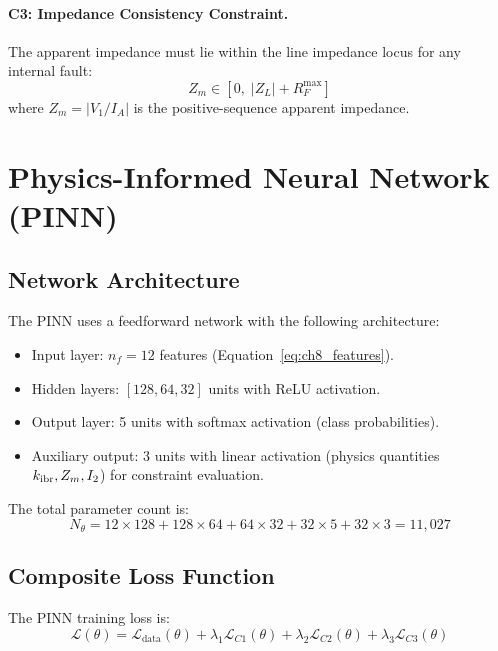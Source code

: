 \paragraph{C3: Impedance Consistency Constraint.}
The apparent impedance must lie within the line impedance locus for any
internal fault:
\begin{equation}
  Z_m \in [0,\; |Z_L| + R_F^\mathrm{max}]
  \label{eq:ch8_c3}
\end{equation}
where $Z_m = |V_1/I_A|$ is the positive-sequence apparent impedance.

\section{Physics-Informed Neural Network (PINN)}
\label{sec:ch8_pinn}

\subsection{Network Architecture}

The PINN uses a feedforward network with the following architecture:
\begin{itemize}
\item Input layer: $n_f = 12$ features (Equation~\ref{eq:ch8_features}).
\item Hidden layers: $[128, 64, 32]$ units with ReLU activation.
\item Output layer: 5 units with softmax activation (class probabilities).
\item Auxiliary output: 3 units with linear activation (physics quantities
      $k_\mathrm{ibr}, Z_m, I_2$) for constraint evaluation.
\end{itemize}
The total parameter count is:
\begin{equation}
  N_\theta = 12 \times 128 + 128 \times 64 + 64 \times 32 + 32 \times 5
  + 32 \times 3 = 11{,}027
  \label{eq:ch8_params}
\end{equation}

\subsection{Composite Loss Function}

The PINN training loss is:
\begin{equation}
  \mathcal{L}(\theta) = \mathcal{L}_\mathrm{data}(\theta)
    + \lambda_1 \mathcal{L}_{C1}(\theta)
    + \lambda_2 \mathcal{L}_{C2}(\theta)
    + \lambda_3 \mathcal{L}_{C3}(\theta)
  \label{eq:ch8_loss}
\end{equation}

